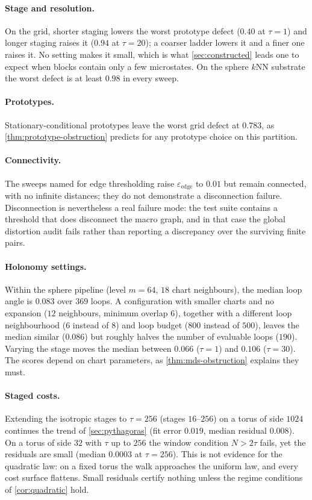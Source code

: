 \documentclass[11pt]{article}
\begin{document}
\paragraph{Stage and resolution.}
On the grid, shorter staging lowers the worst prototype defect ($0.40$ at $\tau=1$) and longer staging raises it ($0.94$ at $\tau=20$); a coarser ladder lowers it and a finer one raises it.
No setting makes it small, which is what \cref{sec:constructed} leads one to expect when blocks contain only a few microstates.
On the sphere $k$NN substrate the worst defect is at least $0.98$ in every sweep.

\paragraph{Prototypes.}
Stationary-conditional prototypes leave the worst grid defect at $0.783$, as \cref{thm:prototype-obstruction} predicts for any prototype choice on this partition.

\paragraph{Connectivity.}
The sweeps named for edge thresholding raise $\varepsilon_{\mathrm{edge}}$ to $0.01$ but remain connected, with no infinite distances; they do not demonstrate a disconnection failure.
Disconnection is nevertheless a real failure mode: the test suite contains a threshold that does disconnect the macro graph, and in that case the global distortion audit fails rather than reporting a discrepancy over the surviving finite pairs.

\paragraph{Holonomy settings.}
Within the sphere pipeline (level $m=64$, $18$ chart neighbours), the median loop angle is $0.083$ over $369$ loops.
A configuration with smaller charts and no expansion ($12$ neighbours, minimum overlap $6$), together with a different loop neighbourhood ($6$ instead of $8$) and loop budget ($800$ instead of $500$), leaves the median similar ($0.086$) but roughly halves the number of evaluable loops ($190$).
Varying the stage moves the median between $0.066$ ($\tau=1$) and $0.106$ ($\tau=30$).
The scores depend on chart parameters, as \cref{thm:mds-obstruction} explains they must.

\paragraph{Staged costs.}
Extending the isotropic stages to $\tau=256$ (stages $16$--$256$) on a torus of side $1024$ continues the trend of \cref{sec:pythagoras} (fit error $0.019$, median residual $0.008$).
On a torus of side $32$ with $\tau$ up to $256$ the window condition $N>2\tau$ fails, yet the residuals are small (median $0.0003$ at $\tau=256$).
This is not evidence for the quadratic law: on a fixed torus the walk approaches the uniform law, and every cost surface flattens.
Small residuals certify nothing unless the regime conditions of \cref{cor:quadratic} hold.
\end{document}
